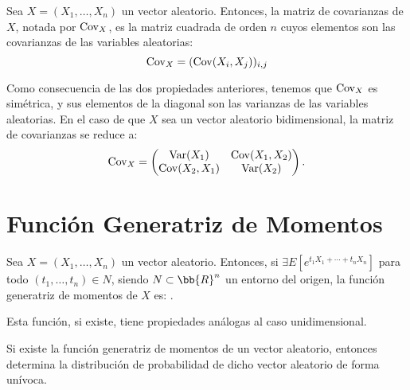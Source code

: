 \begin{definicion}
    Sea $X=(X_1,\dots,X_n)$ un vector aleatorio. Entonces, la matriz de covarianzas de $X$, notada por $\operatorname{Cov}_X$, es la matriz cuadrada de orden $n$ cuyos elementos son las covarianzas de las variables aleatorias:
    \begin{equation*}
        \operatorname{Cov}_X = (\operatorname{Cov}(X_i,X_j))_{i,j}
    \end{equation*}
\end{definicion}
Como consecuencia de las dos propiedades anteriores, tenemos que $\operatorname{Cov}_X$ es simétrica, y sus elementos de la diagonal son las varianzas de las variables aleatorias. En el caso de que $X$ sea un vector aleatorio bidimensional, la matriz de covarianzas se reduce a:
\begin{equation*}
    \operatorname{Cov}_X = \begin{pmatrix}
        \operatorname{Var}(X_1) & \operatorname{Cov}(X_1,X_2)\\
        \operatorname{Cov}(X_2,X_1) & \operatorname{Var}(X_2)
    \end{pmatrix}.
\end{equation*}

\section{Función Generatriz de Momentos}

\begin{definicion}
    Sea $X=(X_1,\dots,X_n)$ un vector aleatorio. Entonces, si $\exists E[e^{t_1X_1+\cdots+t_nX_n}]$ para todo $(t_1,\dots,t_n)\in N$, siendo $N\subset \bb{R}^n$ un entorno del origen, la función generatriz de momentos de $X$ es:
    .
\end{definicion}

Esta función, si existe, tiene propiedades análogas al caso unidimensional.
\begin{teo}[Unicidad]
    Si existe la función generatriz de momentos de un vector aleatorio, entonces determina la distribución de probabilidad de dicho vector aleatorio de forma unívoca.
\end{teo}

